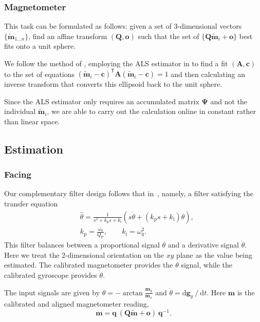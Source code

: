 \documentclass{nime-alternate} %
\begin{document}
\subsubsection{Magnetometer}
\label{appendix:calib-mag}
This task can be formulated as follows: given a set of 3-dimensional vectors $\{ \tilde{\mathbf{m}}_{1 \dots n} \}$, find an affine transform $(\mathbf{Q}, \mathbf{o})$ such that the set of $\{\mathbf{Q} \tilde{\mathbf{m}}_i + \mathbf{o}\}$ best fits onto a unit sphere.

We follow the method of \cite{Renaudin2010}, employing the ALS estimator in \cite{Markovsky_2004_ALS} to find a fit $(\mathbf{A}, \mathbf{c})$ to the set of equations
$(\tilde{\mathbf{m}}_i - \mathbf{c})^\mathsf{T} \mathbf{A} (\tilde{\mathbf{m}}_i - \mathbf{c}) = 1$
and then calculating an inverse transform that converts this ellipsoid back to the unit sphere.

Since the ALS estimator only requires an accumulated matrix $\mathbf{\Psi}$ and not the individual $\tilde{\mathbf{m}}_i$, we are able to carry out the calculation online in constant rather than linear space.

\subsection{Estimation}
\subsubsection{Facing}
\label{appendix:est-facing}
Our complementary filter design follows that in~\cite{Min_Complementary}, namely, a filter satisfying the transfer equation
\begin{equation}
\begin{split}
& \hat{\theta} = \frac 1 {s^2 + k_\mathrm{p} s + k_\mathrm{i}} \left( s \dot\theta + (k_\mathrm{p} s + k_\mathrm{i}) \theta \right) \text{,} \\
& k_\mathrm{p} = \frac {\omega_0} {Q_\mathrm{P}},\qquad k_\mathrm{i} = \omega_0^2\text{.}
\end{split}
\end{equation}
This filter balances between a proportional signal $\theta$ and a derivative signal $\dot\theta$. Here we treat the 2-dimensional orientation on the $xy$ plane as the value being estimated. The calibrated magnetometer provides the $\theta$ signal, while the calibrated gyroscope provides $\dot\theta$.

The input signals are given by $\theta = -\mathop{\mathrm{arctan}} \frac {\mathbf{m}_y} {\mathbf{m}_x}$ and $\dot\theta = \mathrm{d}{\mathbf{g}_y} \mathbin{\mathop{/}} \mathrm{d}t$. Here $\mathbf{m}$ is the calibrated and aligned magnetometer reading,
\begin{equation}\label{eqn:est-facing}
\mathbf{m} = \mathbf{q} \ (\mathbf{Q}\tilde{\mathbf{m}} + \mathbf{o}) \ \mathbf{q}^{-1}\text{.}
\end{equation}
\end{document}
